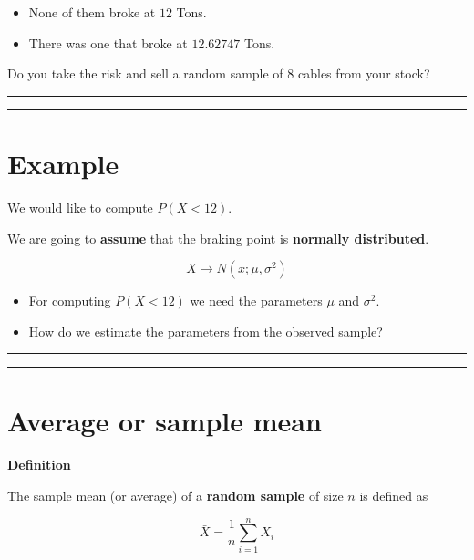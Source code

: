 \documentclass[
]{book}
\begin{document}
\begin{itemize}
\item
  None of them broke at \(12\) Tons.
\item
  There was one that broke at \(12.62747\) Tons.
\end{itemize}

Do you take the risk and sell a random sample of \(8\) cables from your stock?

\begin{center}\rule{0.5\linewidth}{0.5pt}\end{center}

\begin{center}\rule{0.5\linewidth}{0.5pt}\end{center}

\hypertarget{example-15}{%
\section{Example}\label{example-15}}

We would like to compute \(P(X<12)\).

We are going to \textbf{assume} that the braking point is \textbf{normally distributed}.

\[X \rightarrow N(x; \mu, \sigma^2)\]

\begin{itemize}
\item
  For computing \(P(X <12)\) we need the parameters \(\mu\) and \(\sigma^2\).
\item
  How do we estimate the parameters from the observed sample?
\end{itemize}

\begin{center}\rule{0.5\linewidth}{0.5pt}\end{center}

\begin{center}\rule{0.5\linewidth}{0.5pt}\end{center}

\hypertarget{average-or-sample-mean}{%
\section{Average or sample mean}\label{average-or-sample-mean}}

\textbf{Definition}

The sample mean (or average) of a \textbf{random sample} of size \(n\) is defined as

\[\bar{X}=\frac{1}{n}\sum_{i=1}^n X_i\]
\end{document}
